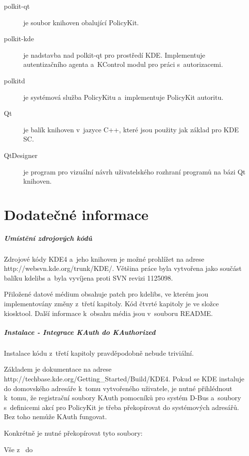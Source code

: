 \begin{description}
\item[polkit-qt] je soubor knihoven obalující PolicyKit.
\item[polkit-kde] je nadstavba nad polkit-qt pro prostředí KDE. Implementuje autentizačního agenta a~KControl modul pro práci s~autorizacemi.
\item[polkitd] je systémová služba PolicyKitu a~implementuje PolicyKit autoritu.
\item[Qt] je balík knihoven v~jazyce C++, které jsou použity jak základ pro KDE SC.
\item[QtDesigner] je program pro vizuální návrh uživatelského rozhraní programů na bázi Qt knihoven.
\end{description}
\chapter{Dodatečné informace}
\paragraph{Umístění zdrojových kódů}
Zdrojové kódy KDE4 a~jeho knihoven je možné prohlížet na adrese http://websvn.kde.org/trunk/KDE/. Většina práce byla vytvořena jako součást balíku kdelibs a~byla vyvíjena proti SVN revizi 1125098.

Přiložené datové médium obsahuje patch pro kdelibs, ve kterém jsou implementovány změny z~třetí kapitoly.
Kód čtvrté kapitoly je ve složce kiosktool.
Další informace k~obsahu média jsou v~souboru README.

\paragraph{Instalace - Integrace KAuth do KAuthorized}
Instalace kódu z~třetí kapitoly pravděpodobně nebude triviální.

\noindent
Základem je dokumentace na adrese http://techbase.kde.org/Getting\_Started/Build/KDE4. Pokud se KDE instaluje do domovského adresáře k~tomu vytvořeného uživatele, je nutné přihlédnout k~tomu, že registrační soubory KAuth pomocníků pro systém D-Bus a~soubory s~definicemi akcí pro PolicyKit je třeba překopírovat do systémových adresářů. Bez toho nemůže KAuth fungovat.

\noindent
Konkrétně je nutné překopírovat tyto soubory:

\noindent
Vše z~ do 

